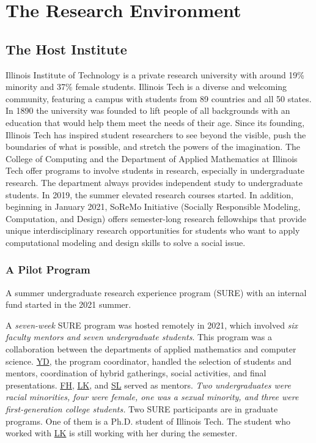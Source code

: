 \documentclass[11pt]{NSFamsart}
\newcommand{\FH}{\hyperlink{FHlink}{FH}\xspace}
\newcommand{\YD}{\hyperlink{YDlink}{YD}\xspace}
\newcommand{\LK}{\hyperlink{LKlink}{LK}\xspace}
\newcommand{\SL}{\hyperlink{SLlink}{SL}\xspace}
\begin{document}















\section{The Research Environment}


 
\subsection{The Host Institute}

Illinois Institute of Technology is a private research university with around 19\% minority and 37\% female students. Illinois Tech is a diverse and welcoming community, featuring a campus with students from 89 countries and all 50 states. In 1890 the university was founded to lift people of all backgrounds with an education that would help them meet the needs of their age. Since its founding, Illinois Tech has inspired student researchers to see beyond the visible, push the boundaries of what is possible, and stretch the powers of the imagination. The College of Computing
and the Department of Applied Mathematics at Illinois Tech offer programs to involve students
in research, especially in undergraduate research. The department always provides independent study to undergraduate students. In 2019, the summer elevated research courses started. In addition, beginning in January 2021, SoReMo Initiative (Socially Responsible Modeling, Computation, and Design) offers semester-long research fellowships that provide unique interdisciplinary research opportunities for students who want to apply computational modeling and design skills to solve a social issue. 





\subsubsection{A Pilot Program}
A summer
undergraduate research experience program (SURE) with an internal fund started in the 2021 summer. 

A \emph{seven-week} SURE program was hosted remotely in 2021, which involved \emph{six faculty mentors and seven undergraduate students}. This program was a collaboration between the departments of applied mathematics and computer science. \YD, the program coordinator, handled the selection of students and mentors, coordination of hybrid gatherings, social activities, and final presentations. \FH, \LK, and \SL served as mentors. \emph{Two undergraduates were racial minorities, four were female, one was a sexual minority, and three were first-generation college students.} Two SURE participants are in graduate programs. One of them is a Ph.D. student of Illinois Tech. The student who worked with \LK is still working with her during the semester.
\end{document}
